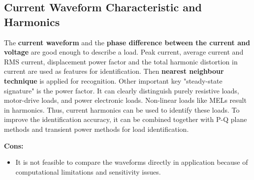 \documentclass[11pt, a4paper]{article} %
\begin{document}
\subsection{Current Waveform Characteristic and Harmonics}
The \textbf{current waveform} and the \textbf{phase difference between the current and voltage} are good enough to describe a load\cite{Saitoh2008CurrentSB}. Peak current, average current and RMS current, displacement power factor and the total harmonic distortion in current are used as features for identification. Then \textbf{nearest neighbour technique} is applied for recognition. Other important key "steady-state signature" is the power factor. It can clearly distinguish purely resistive loads, motor-drive loads, and power electronic loads.
Non-linear loads like MELs result in harmonics. Thus, current harmonics can be used to identify these loads. To improve the identification accuracy, it can be combined together with P-Q plane methods and transient power methods for load identification.

\newline
\textbf{Cons:}
\begin{itemize}
    \item It is not feasible to compare the waveforms directly in application because of computational limitations and sensitivity issues.
\end{itemize}

\end{document}

